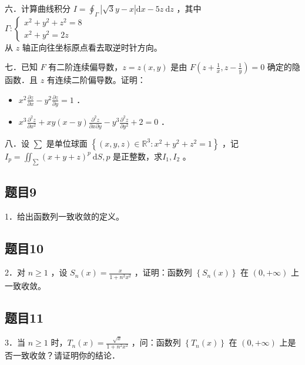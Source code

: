 \documentclass{article}
\begin{document}
六．计算曲线积分 \(I=\oint_{\Gamma}|\sqrt{3} y-x| \mathrm{d} x-5 z \mathrm{~d} z\) ，其中\\
\(\Gamma:\left\{\begin{array}{l}x^{2}+y^{2}+z^{2}=8 \\ x^{2}+y^{2}=2 z\end{array}\right.\)\\
从 \(z\) 轴正向往坐标原点看去取逆时针方向。

七．已知 \(F\) 有二阶连续偏导数，\(z=z(x, y)\) 是由 \(F\left(z+\frac{1}{x}, z-\frac{1}{y}\right)=0\) 确定的隐函数．且 \(z\) 有连续二阶偏导数。证明：

\begin{itemize}

  \item[1．] \(x^{2} \frac{\partial z}{\partial x}-y^{2} \frac{\partial z}{\partial y}=1\) ．

  \item[2．] \(x^{3} \frac{\partial^{2} z}{\partial x^{2}}+x y(x-y) \frac{\partial^{2} z}{\partial x \partial y}-y^{3} \frac{\partial^{2} z}{\partial y^{2}}+2=0\) ．
\end{itemize}

八．设 \(\sum\) 是单位球面 \(\left\{(x, y, z) \in \mathbb{R}^{3}: x^{2}+y^{2}+z^{2}=1\right\}\) ，记 \(I_{p}=\iint_{\sum}(x+y+z)^{p} \mathrm{~d} S, p\) 是正整数，求\(I_{1}, I_{2}\) 。

\subsection{题目9}
1．给出函数列一致收敛的定义。

\subsection{题目10}
2．对 \(n \geq 1\) ，设 \(S_{n}(x)=\frac{x}{1+n^{2} x^{2}}\) ，证明：函数列 \(\left\{S_{n}(x)\right\}\) 在 \((0,+\infty)\) 上一致收敛。

\subsection{题目11}
3．当 \(n \geq 1\) 时，\(T_{n}(x)=\frac{\sqrt{x}}{1+n^{2} x^{2}}\) ，问：函数列 \(\left\{T_{n}(x)\right\}\) 在 \((0,+\infty)\) 上是否一致收敛？请证明你的结论．
\end{document}
